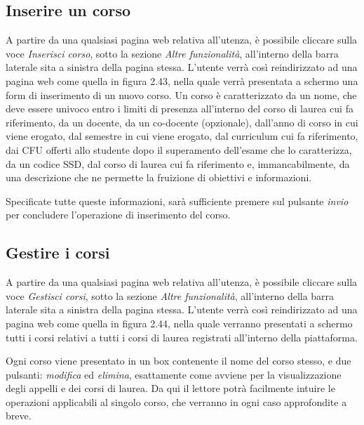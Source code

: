 \documentclass [a4paper,11pt]{book}
\begin{document}
\medskip

\subsection{Inserire un corso}

A partire da una qualsiasi pagina web relativa all'utenza, è possibile cliccare sulla voce \emph{Inserisci corso}, sotto la sezione \emph{Altre funzionalità}, all'interno della barra laterale sita a sinistra della pagina stessa. L'utente verrà così reindirizzato ad una pagina web come quella in figura 2.43, nella quale verrà presentata a schermo una form di inserimento di un nuovo corso. Un corso è caratterizzato da un nome, che deve essere univoco entro i limiti di presenza all'interno del corso di laurea cui fa riferimento, da un docente, da un co-docente (opzionale), dall'anno di corso in cui viene erogato, dal semestre in cui viene erogato, dal curriculum cui fa riferimento, dai CFU offerti allo studente dopo il superamento dell'esame che lo caratterizza, da un codice SSD, dal corso di laurea cui fa riferimento e, immancabilmente, da una descrizione che ne permette la fruizione di obiettivi e informazioni.


Specificate tutte queste informazioni, sarà sufficiente premere sul pulsante \emph{invio} per concludere l'operazione di inserimento del corso.

\medskip

\subsection{Gestire i corsi}

A partire da una qualsiasi pagina web relativa all'utenza, è possibile cliccare sulla voce \emph{Gestisci corsi}, sotto la sezione \emph{Altre funzionalità}, all'interno della barra laterale sita a sinistra della pagina stessa. L'utente verrà così reindirizzato ad una pagina web come quella in figura 2.44, nella quale verranno presentati a schermo tutti i corsi relativi a tutti i corsi di laurea registrati all'interno della piattaforma.


Ogni corso viene presentato in un box contenente il nome del corso stesso, e due pulsanti: \emph{modifica} ed \emph{elimina}, esattamente come avviene per la visualizzazione degli appelli e dei corsi di laurea. Da qui il lettore potrà facilmente intuire le operazioni applicabili al singolo corso, che verranno in ogni caso approfondite a breve.
\end{document}
